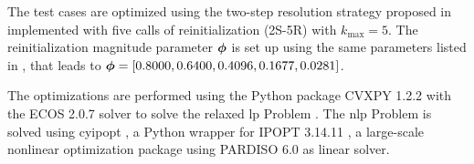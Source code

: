 The test cases are optimized using the two-step resolution strategy proposed in  implemented with five calls of reinitialization (2S-5R) with $k_{\text{max}}=5$. The reinitialization magnitude parameter $\bm{\phi}$ is set up using the same parameters listed in , that leads to $\bm{\phi} = \left[ 0.8000, 0.6400, 0.4096, 0.1677, 0.0281 \right]$.

The optimizations are performed using the Python package CVXPY 1.2.2  with the ECOS 2.0.7  solver to solve the relaxed \gls{lp} Problem . The \gls{nlp} Problem  is solved using cyipopt , a Python wrapper for IPOPT 3.14.11 , a large-scale nonlinear optimization package using PARDISO 6.0  as linear solver. 

